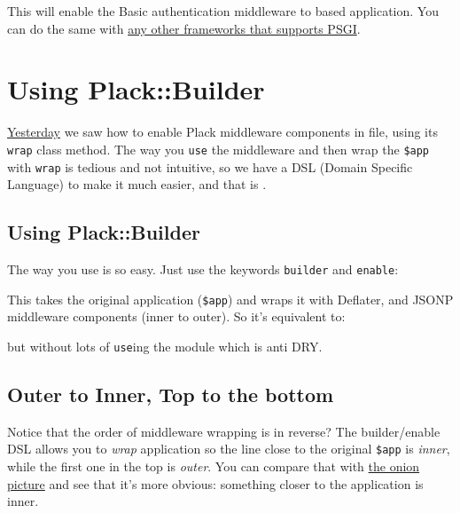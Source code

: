 
This will enable the Basic authentication middleware to 
based application. You can do the same with
\href{http://plackperl.org/\#frameworks}{any other frameworks that
supports PSGI}.

\chapter{Using Plack::Builder}\label{day-11-using-plackbuilder}

\href{http://advent.plackperl.org/2009/12/day-10-using-plack-middleware.html}{Yesterday}
we saw how to enable Plack middleware components in  file, using
its \lstinline!wrap! class method. The way you \lstinline!use! the
middleware and then wrap the \lstinline!$app! with \lstinline!wrap! is
tedious and not intuitive, so we have a DSL (Domain Specific Language)
to make it much easier, and that is .

\section{Using Plack::Builder}\label{using-plackbuilder}

The way you use  is so easy. Just use the keywords
\lstinline!builder! and \lstinline!enable!:


This takes the original application (\lstinline!$app!) and wraps it with
Deflater,  and JSONP middleware components (inner to outer).
So it's equivalent to:

%
but without lots of \lstinline!use!ing the module which is anti DRY.

\section{Outer to Inner, Top to the
bottom}\label{outer-to-inner-top-to-the-bottom}

Notice that the order of middleware wrapping is in reverse? The
builder/enable DSL allows you to \emph{wrap} application so the line
close to the original \lstinline!$app! is \emph{inner}, while the first
one in the top is \emph{outer}. You can compare that with
\href{http://pylonshq.com/docs/en/0.9.7/_images/pylons_as_onion.png}{the
onion picture} and see that it's more obvious: something closer to the
application is inner.

